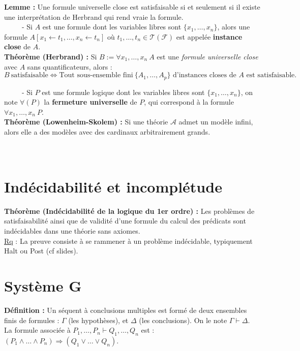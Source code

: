\documentclass[11pt,a4paper]{article}
\begin{document}
\textbf{Lemme :} Une formule universelle close est satisfaisable si et seulement si il existe une interprétation de Herbrand qui rend vraie la formule. \\

\ \ \ \ \ - Si $A$ est une formule dont les variables libres sont $\{x_1,\dots,x_n\}$, alors une formule $A[x_1 \leftarrow t_1, \dots, x_n \leftarrow t_n]$ où $t_1,\dots,t_n \in \mathcal{T}(\mathcal{F})$ est appelée \textbf{instance close} de $A$. \\

\textbf{Théorème (Herbrand) :} Si $B:=\forall x_1,\dots,x_n \ A$ est une \textit{formule universelle close} avec $A$ sans quantificateurs, alors :
\[B \ \text{satisfaisable} \Leftrightarrow \text{Tout sous-ensemble fini} \  \{A_1,\dots,A_p\} \text{ d'instances closes de } A \text{ est satisfaisable.} \]

\ \ \ \ \ - Si $P$ est une formule logique dont les variables libres sont $\{x_1,\dots,x_n\}$, on note $\forall(P)$ la \textbf{fermeture universelle} de $P$, qui correspond à la formule $\forall x_1, \dots , x_n \ P$. \\

\textbf{Théorème (Lowenheim-Skolem) :} Si une théorie $\mathcal{A}$ admet un modèle infini, alors elle a des modèles avec des cardinaux arbitrairement grands. \\ \\ \\

\section{Indécidabilité et incomplétude}

\textbf{Théorème (Indécidabilité de la logique du 1er ordre) :} Les problèmes de satisfaisabilité ainsi que de validité d’une formule du calcul des prédicats sont indécidables dans une théorie sans axiomes. \\

\underline{Rq} : La preuve consiste à se rammener à un problème indécidable, typiquement Halt ou Post (cf slides). \\


\section{Système G}

\textbf{Définition :} Un séquent à conclusions multiples est formé de deux ensembles finis de formules : $\Gamma$ (les hypothèses), et $\Delta$ (les conclusions). On le note $\Gamma	\vdash \Delta$. \\
La formule associée à $P_1,\dots ,P_n \vdash Q_1,\dots, Q_n$ est : $(P_1\land \dots \land P_n) \Rightarrow (Q_1 \lor \dots \lor Q_n)$. \\
\end{document}

